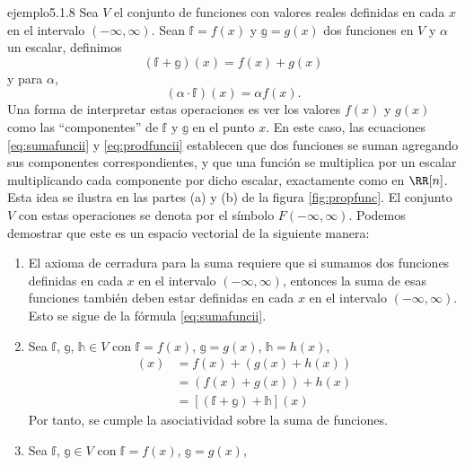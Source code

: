 \begin{examplebox}{}{ejemplo5.1.8}
    Sea $V$ el conjunto de funciones con valores reales definidas en cada $x$ en el intervalo $(-\infty, \infty)$. Sean $\mathbb{f} = f(x)$ y $\mathbb{g} = g(x)$ dos funciones en $V$ y $\alpha$ un escalar, definimos
    \begin{equation}
        (\mathbb{f} + \mathbb{g})(x) = f(x) + g(x) \label{eq:sumafuncii}
    \end{equation}
    y para $\alpha$,
    \begin{equation}
        (\alpha \cdot \mathbb{f})(x) = \alpha f(x). \label{eq:prodfuncii}
    \end{equation}
    Una forma de interpretar estas operaciones es ver los valores $f(x)$ y $g(x)$ como las “componentes” de $\mathbb{f}$ y $\mathbb{g}$ en el punto $x$. En este caso, las ecuaciones \eqref{eq:sumafuncii} y \eqref{eq:prodfuncii} establecen que dos funciones se suman agregando sus componentes correspondientes, y que una función se multiplica por un escalar multiplicando cada componente por dicho escalar, exactamente como en $\RR[n]$. Esta idea se ilustra en las partes (a) y (b) de la figura \ref{fig:propfunc}. El conjunto $V$ con estas operaciones se denota por el símbolo $F(-\infty, \infty)$. Podemos demostrar que este es un espacio vectorial de la siguiente manera:
    \begin{enumerate}[label=\roman*), topsep=6pt, itemsep=0pt]
        \item El axioma de cerradura para la suma requiere que si sumamos dos funciones definidas en cada $x$ en el intervalo $(-\infty, \infty)$, entonces la suma de esas funciones también deben estar definidas en cada $x$ en el intervalo $(-\infty, \infty)$. Esto se sigue de la fórmula \eqref{eq:sumafuncii}.
        \item Sea $\mathbb{f}$, $\mathbb{g}$, $\mathbb{h} \in V$ con $\mathbb{f} = f(x)$, $\mathbb{g} = g(x)$, $\mathbb{h} = h(x)$,
        \begin{align*}
            [\mathbb{f} + (\mathbb{g} + \mathbb{h})](x) & = f(x) + (g(x) + h(x)) \\
            & = (f(x) + g(x)) + h(x) \\
            & = [(\mathbb{f} + \mathbb{g}) + \mathbb{h}](x)
        \end{align*}
        Por tanto, se cumple la asociatividad sobre la suma de funciones.
        \item Sea $\mathbb{f}$, $\mathbb{g} \in V$ con $\mathbb{f} = f(x)$, $\mathbb{g} = g(x)$,
        \begin{align*}

\end{align*}
\end{enumerate}
\end{examplebox}

